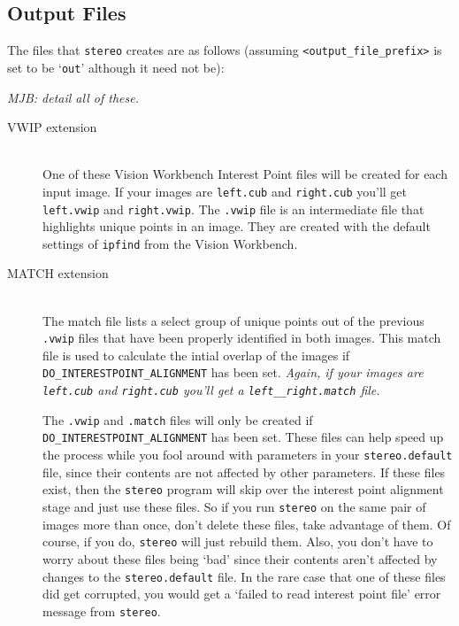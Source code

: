 \subsection{Output Files}
The files that \verb=stereo= creates are as follows (assuming
\verb=<output_file_prefix>= is set to be `\verb=out=' although it need
not be):

\emph{MJB: detail all of these.}

\begin{description}

\item[VWIP extension] \hfill \\ 
  One of these Vision Workbench Interest
  Point files will be created for each input image. If your images are
  \texttt{left.cub} and \texttt{right.cub} you'll get
  \texttt{left.vwip} and \texttt{right.vwip}. The \texttt{.vwip} file
  is an intermediate file that highlights unique points in an
  image. They are created with the default settings of \texttt{ipfind}
  from the Vision Workbench.

\item[MATCH extension] \hfill \\ 
  The match file lists a select group
  of unique points out of the previous \texttt{.vwip} files that have
  been properly identified in both images. This match file is used to
  calculate the intial overlap of the images if
  \texttt{DO\_INTERESTPOINT\_ALIGNMENT} has been set.  \emph{Again, if
    your images are \texttt{left.cub} and \texttt{right.cub} you'll
    get a \texttt{left\_\_right.match} file.}

  The \texttt{.vwip} and \texttt{.match} files will only be created if
  \texttt{DO\_INTERESTPOINT\_ALIGNMENT} has been set.  These files can
  help speed up the process while you fool around with parameters in
  your \texttt{stereo.default} file, since their contents are not
  affected by other parameters.  If these files exist, then the
  \texttt{stereo} program will skip over the interest point alignment
  stage and just use these files.  So if you run \texttt{stereo} on
  the same pair of images more than once, don't delete these files,
  take advantage of them.  Of course, if you do, \texttt{stereo} will
  just rebuild them.  Also, you don't have to worry about these files
  being `bad' since their contents aren't affected by changes to the
  \texttt{stereo.default} file.  In the rare case that one of these
  files did get corrupted, you would get a `failed to read interest
  point file' error message from \texttt{stereo}.


\end{description}
